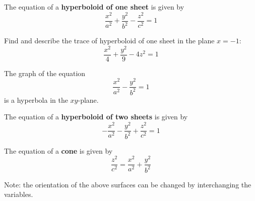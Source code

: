 \documentclass[handout]{ximera}
\begin{document}
\begin{image}
\end{image}


The equation of a \textbf{hyperboloid of one sheet} is given by 
\[
\frac{x^2}{a^2} + \frac{y^2}{b^2}- \frac{z^2}{c^2} = 1
\]

\begin{problem}[Problem 2c]
Find and describe the trace of hyperboloid of one sheet in the plane $x = -1$:
\[
\frac{x^2}{4} + \frac{y^2}{9} - 4z^2 = 1
\]
\begin{hint}
The graph of the equation
\[
\frac{x^2}{a^2} - \frac{y^2}{b^2} = 1
\]
is a hyperbola in the $xy$-plane.
\end{hint}
\end{problem}

The equation of a \textbf{hyperboloid of two sheets} is given by 
\[
-\frac{x^2}{a^2} -\frac{y^2}{b^2} + \frac{z^2}{c^2} = 1
\]

The equation of a \textbf{cone} is given by 
\[
\frac{z^2}{c^2} = \frac{x^2}{a^2} + \frac{y^2}{b^2}
\]

Note: the orientation of the above surfaces can be changed by interchanging the variables.
\end{document}
